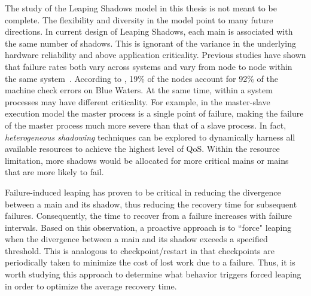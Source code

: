 The study of the Leaping Shadows model in this thesis is not meant to be complete. The flexibility and diversity in the model point to many future directions. In current design of Leaping Shadows, each main is associated with the same number of shadows. This is ignorant of the variance in the underlying hardware reliability and above application criticality. 
Previous studies have shown that failure rates both vary across systems and vary from node to node within the same system~\cite{schroeder2007,di2014lessons}. According to \cite{di2014lessons}, 19\% of the nodes account for 92\% of the machine check errors on Blue Waters. %
At the same time, within a system processes may have different criticality. %
For example, in the master-slave execution model the master process is a single point of failure, making the failure of the master process much more severe than that of a slave process. %
In fact, \textit{heterogeneous shadowing} techniques can be explored to dynamically harness all available resources to achieve the highest level of QoS. 
Within the resource limitation, more shadows would be allocated for more critical mains or mains that are more likely to fail. 

Failure-induced leaping has proven to be critical in reducing the divergence between a main and its shadow, thus reducing the recovery time for subsequent failures. Consequently, the time to recover from a failure increases with failure intervals. Based on this observation, a proactive approach is to ``force" leaping when the divergence between a main and its shadow exceeds a specified threshold. This is analogous to checkpoint/restart in that checkpoints are periodically taken to minimize the cost of lost work due to a failure. Thus, it is worth studying this approach to determine what behavior triggers forced leaping in order to optimize the average recovery time.

